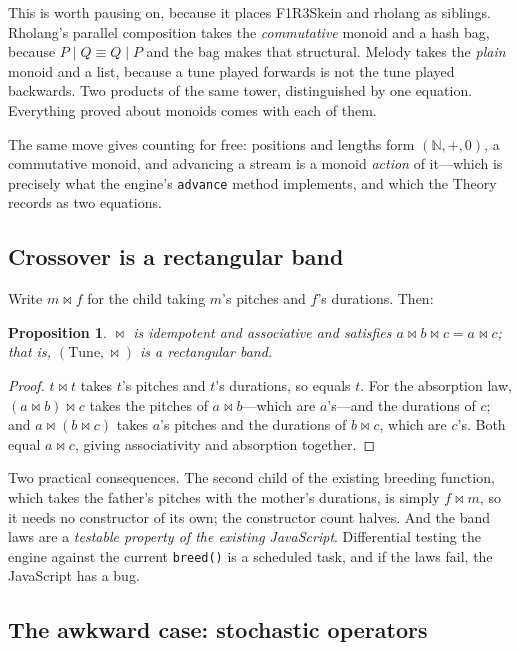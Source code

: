 \documentclass[11pt,a4paper]{article}
\theoremstyle{definition}
\theoremstyle{plain}
\newtheorem{proposition}{Proposition}
\begin{document}
This is worth pausing on, because it places F1R3Skein and rholang as siblings. Rholang's parallel
composition takes the \emph{commutative} monoid and a hash bag, because $P \mid Q \equiv Q \mid P$
and the bag makes that structural. Melody takes the \emph{plain} monoid and a list, because a tune
played forwards is not the tune played backwards. Two products of the same tower, distinguished by
one equation. Everything proved about monoids comes with each of them.

The same move gives counting for free: positions and lengths form $(\mathbb{N}, +, 0)$, a
commutative monoid, and advancing a stream is a monoid \emph{action} of it---which is precisely
what the engine's \texttt{advance} method implements, and which the Theory records as two
equations.

\subsection{Crossover is a rectangular band}

Write $m \bowtie f$ for the child taking $m$'s pitches and $f$'s durations. Then:

\begin{proposition}
$\bowtie$ is idempotent and associative and satisfies $a \bowtie b \bowtie c = a \bowtie c$; that
is, $(\mathrm{Tune}, \bowtie)$ is a rectangular band.
\end{proposition}

\begin{proof}
$t \bowtie t$ takes $t$'s pitches and $t$'s durations, so equals $t$. For the absorption law,
$(a \bowtie b) \bowtie c$ takes the pitches of $a \bowtie b$---which are $a$'s---and the durations
of $c$; and $a \bowtie (b \bowtie c)$ takes $a$'s pitches and the durations of $b \bowtie c$,
which are $c$'s. Both equal $a \bowtie c$, giving associativity and absorption together.
\end{proof}

Two practical consequences. The second child of the existing breeding function, which takes the
father's pitches with the mother's durations, is simply $f \bowtie m$, so it needs no constructor
of its own; the constructor count halves. And the band laws are a \emph{testable property of the
existing JavaScript}. Differential testing the engine against the current \texttt{breed()} is a
scheduled task, and if the laws fail, the JavaScript has a bug.

\subsection{The awkward case: stochastic operators}
\end{document}
